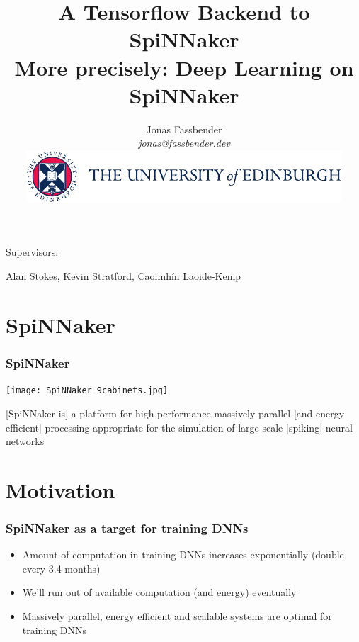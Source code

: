 \documentclass[xcolor=x11names,compress,usenames,dvipsnames,mathsans]{beamer}
\title{A Tensorflow Backend to SpiNNaker \\
  More precisely: Deep Learning on SpiNNaker}
\author[author]{Jonas Fassbender \\
\textit{jonas@fassbender.dev} \\
\vspace{1em}
\includegraphics[scale=.8]{logo_colour.pdf}
}
\date{}
\begin{document}
\begin{frame}
  \titlepage
  \vspace{-2cm}

  \begin{center}
  Supervisors:

  Alan Stokes, Kevin Stratford, Caoimhín Laoide-Kemp
  \end{center}
\end{frame}

\section{SpiNNaker}

\begin{frame}[fragile]
  \frametitle{SpiNNaker}

  \begin{center}
    \texttt{[image: SpiNNaker\_9cabinets.jpg]}
  \end{center}

  [SpiNNaker is] a platform for high-performance massively
  parallel [and energy efficient] processing appropriate
  for the simulation of large-scale [spiking] neural
  networks \cite{spinnaker_project}

\end{frame}

\section{Motivation}

\begin{frame}[fragile]
  \frametitle{SpiNNaker as a target for training DNNs}

  \begin{itemize}[<+->]
    \item Amount of computation in training DNNs
          increases exponentially (double every 3.4 months)
          \cite{openai2019}
    \item We'll run out of available computation (and
          energy) eventually
    \item Massively parallel, energy efficient and scalable
          systems are optimal for training DNNs
  \end{itemize}
\end{frame}

\end{document}
